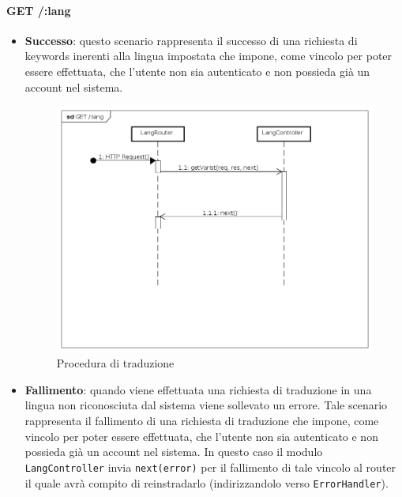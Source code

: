 \paragraph{GET /:lang}
\begin{itemize}
\item \textbf{Successo}: questo scenario rappresenta il successo di una richiesta di keywords inerenti alla lingua impostata che impone, come vincolo per poter essere effettuata, che l'utente non sia autenticato e non possieda già un account nel sistema.  
\label{Procedura di traduzione}
\begin{figure}[ht]
	\centering
	\includegraphics[scale=0.40]{UML/DiagrammiDiSequenza/Back-end/GET_lang_success.png}
	\caption{Procedura di traduzione}
\end{figure}
\FloatBarrier

\item \textbf{Fallimento}: quando viene effettuata una richiesta di traduzione in una lingua non riconosciuta dal sistema viene sollevato un errore. Tale scenario rappresenta il fallimento di una richiesta di traduzione che impone, come vincolo per poter essere effettuata, che l'utente non sia autenticato e non possieda già un account nel sistema. In questo caso il modulo \texttt{LangController} invia \texttt{next(error)} per il fallimento di tale vincolo al router il quale avrà compito di reinstradarlo (indirizzandolo verso \texttt{ErrorHandler}).
 

\end{itemize}
